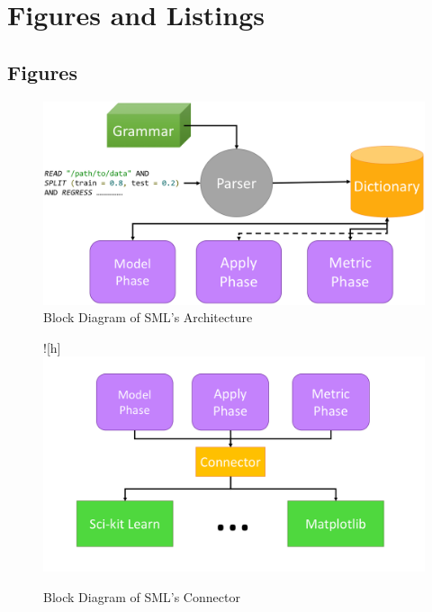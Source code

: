 \clearpage

\section{Figures and Listings}

\subsection{Figures}
\begin{figure}
\includegraphics[width=.9\textwidth]{figures/SML/architecture.png}
\centering
\caption{Block Diagram of SML's Architecture\\}
\label{fig:SML:Architecture}
\end{figure}

\begin{figure}![h]
\includegraphics[width=1\textwidth]{figures/SML/connector.png}
\centering
\caption{Block Diagram of SML's Connector\\}
\label{fig:SML:Connector}
\end{figure}


